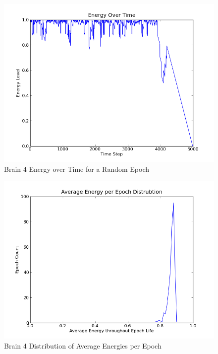 \documentclass[a4paper,11pt]{article}
\begin{document}
\begin{figure}
\begin{center}
  \includegraphics[scale=1.0]{img/brain4/1354432461-1.000000-EvT.png}
  \caption{Brain 4 Energy over Time for a Random Epoch}
  \label{fig:b4evt}
\end{center}
\end{figure}

\begin{figure}
\begin{center}
  \includegraphics[scale=1.0]{img/brain4/avgenergyGauss-0.04.png}
  \caption{Brain 4 Distribution of Average Energies per Epoch}
  \label{fig:b4avgenergy}
\end{center}
\end{figure}
\end{document}
